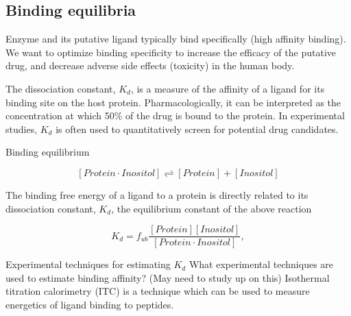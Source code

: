 \subsection{Binding equilibria}
\begin{outline}
	\1 Enzyme and its putative ligand typically bind specifically (high affinity binding).  We want to optimize binding specificity to increase the efficacy of the putative drug, and decrease adverse side effects (toxicity) in the human body.

	\1 The dissociation constant, $K_d$, is a measure of the affinity of a ligand for its binding site on the host protein. Pharmacologically, it can be interpreted as the concentration at which 50\% of the drug is bound to the protein. In experimental studies, $K_d$ is often used to quantitatively screen for potential drug candidates. 

	\1 Binding equilibrium

    \begin{equation}
      \left[ Protein\cdot Inositol \right] 
      \rightleftharpoons 
      \left[ Protein \right]+\left[ Inositol \right]
    \end{equation}
  
    
	\1 The binding free energy of a ligand to a protein is directly related to its dissociation constant, $K_d$, the equilibrium constant of the above reaction

     \begin{equation}
        K_{d} = f_{ub}\frac{\left[ Protein \right]\left[ Inositol \right]}{\left[Protein \cdot Inositol\right]},
     \end{equation}
     
	\1 Experimental techniques for estimating $K_d$
		\2 What experimental techniques are used to estimate binding affinity? (May need to study up on this)
		\2 Isothermal titration calorimetry (ITC) is a technique which can be used to measure energetics of ligand binding to peptides.
\end{outline}	

